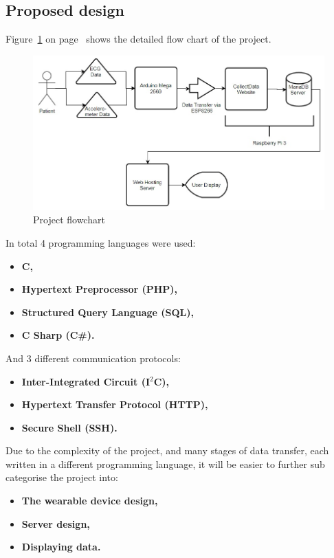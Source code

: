 \documentclass[12pt,]{article}
\numberwithin{figure}{section}
\begin{document}
\subsection{Proposed design}
Figure~\ref{fig:12} on page~\pageref{fig:12} shows the detailed flow chart of the project.
\begin{figure}[h]
  	\begin{center}
    	\includegraphics[width=1\textwidth]{12}
  	\end{center}
  	\caption{Project flowchart}
	\label{fig:12}
\end{figure}
In total 4 programming languages were used:
\begin{itemize}
\item \textbf{C,}
\item \textbf{Hypertext Preprocessor (PHP),}
\item \textbf{Structured Query Language (SQL),}
\item \textbf{C Sharp (C\#).}
\end{itemize}
And 3 different communication protocols:
\begin{itemize}
\item \textbf{Inter-Integrated Circuit (I$^2$C),}
\item \textbf{Hypertext Transfer Protocol (HTTP),}
\item \textbf{Secure Shell (SSH).}
\end{itemize}
Due to the complexity of the project, and many stages of data transfer, each written in a different programming language, it will be easier to further sub categorise the project into:
\begin{itemize}
\item[1] \textbf{The wearable device design,}
\item[2] \textbf{Server design,}
\item[3] \textbf{Displaying data.}
\end{itemize}
\end{document}
